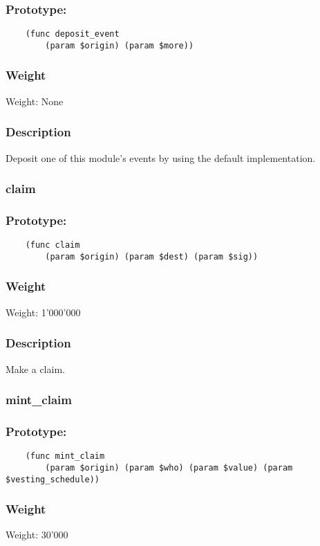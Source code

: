 \documentclass[11pt,a4paper]{article}
\begin{document}
\subsubsection*{Prototype:}
\begin{verbatim}
    (func deposit_event 
        (param $origin) (param $more))
\end{verbatim}
\subsubsection*{Weight}
Weight: None
\subsubsection*{Description}
Deposit one of this module's events by using the default implementation.

\subsubsection{claim}
\subsubsection*{Prototype:}
\begin{verbatim}
    (func claim
        (param $origin) (param $dest) (param $sig))
\end{verbatim}
\subsubsection*{Weight}
Weight: 1'000'000
\subsubsection*{Description}
Make a claim.

\subsubsection{mint\_claim}
\subsubsection*{Prototype:}
\begin{verbatim}
    (func mint_claim
        (param $origin) (param $who) (param $value) (param $vesting_schedule))
\end{verbatim}
\subsubsection*{Weight}
Weight: 30'000
\end{document}
